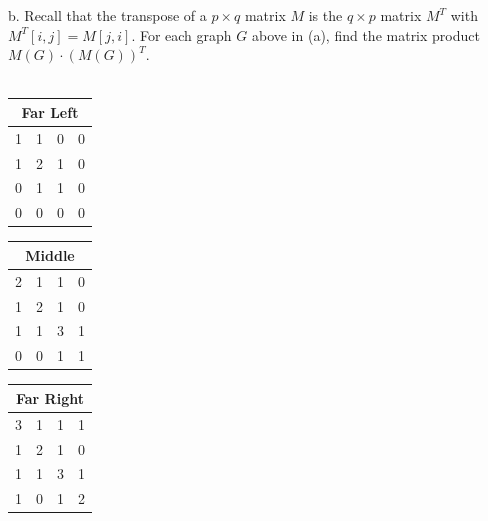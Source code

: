 \documentclass[12pt]{article}
\begin{document}
b. Recall that the transpose of a $ p \times q$ matrix $M$ is the $ q \times p $ matrix $M^{T}$ with $ M^{T}[i,j] = M[j,i]$. For each graph $G$ above in (a), find the matrix product $M(G) \cdot (M(G))^{T}$. \\ \\

\begin{tabular}{|c|c|c|c|} 
\multicolumn{4}{c}{Far Left}  \\ \hline
1 & 1 & 0 & 0 \\ \hline
1 & 2 & 1 & 0 \\ \hline
0 & 1 & 1 & 0 \\ \hline
0 & 0 & 0 & 0\\ \hline
\end{tabular}

\begin{tabular}{|c|c|c|c|} 
\multicolumn{4}{c}{Middle}  \\ \hline
2 & 1 & 1 & 0 \\ \hline
1 & 2 & 1 & 0 \\ \hline
1 & 1 & 3 & 1 \\ \hline
0 & 0 & 1 & 1\\ \hline
\end{tabular}

\begin{tabular}{|c|c|c|c|} 
\multicolumn{4}{c}{Far Right}  \\ \hline
3 & 1 & 1 & 1 \\ \hline
1 & 2 & 1 & 0 \\ \hline
1 & 1 & 3 & 1 \\ \hline
1 & 0 & 1 & 2\\ \hline
\end{tabular}




\end{document}
